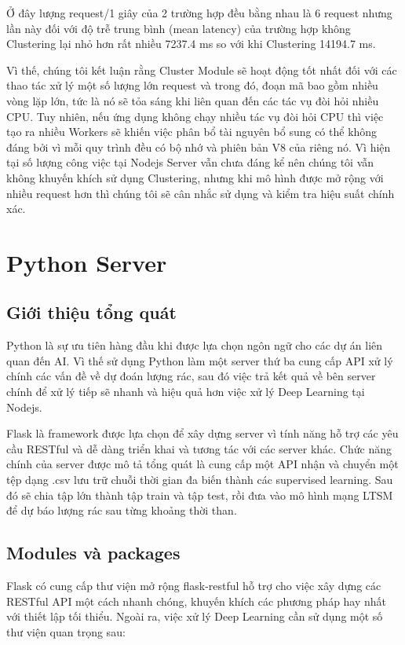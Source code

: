 Ở đây lượng request/1 giây của 2 trường hợp đều bằng nhau là 6 request nhưng lần này đối với độ trễ trung bình (mean latency) của trường hợp không Clustering lại nhỏ hơn rất nhiều 7237.4 ms so với khi Clustering 14194.7 ms.

Vì thế, chúng tôi kết luận rằng Cluster Module sẽ hoạt động tốt nhất đối với các thao tác xử lý một số lượng lớn request và trong đó, đoạn mã bao gồm nhiều vòng lặp lớn, tức là nó sẽ tỏa sáng khi liên quan đến các tác vụ đòi hỏi nhiều CPU. Tuy nhiên, nếu ứng dụng không chạy nhiều tác vụ đòi hỏi CPU thì việc tạo ra nhiều Workers sẽ khiến việc phân bổ tài nguyên bổ sung có thể không đáng bởi vì mỗi quy trình đều có bộ nhớ và phiên bản V8 của riêng nó. Vì hiện tại số lượng công việc tại Nodejs Server vẫn chưa đáng kể nên chúng tôi vẫn không khuyến khích sử dụng Clustering, nhưng khi mô hình được mở rộng với nhiều request hơn thì chúng tôi sẽ cân nhắc sử dụng và kiểm tra hiệu suất chính xác.

\section{Python Server}
\subsection{Giới thiệu tổng quát}
Python là sự ưu tiên hàng đầu khi được lựa chọn ngôn ngữ cho các dự án liên quan đến AI. Vì thế sử dụng Python làm một server thứ ba cung cấp API xử lý chính các vấn đề về dự đoán lượng rác, sau đó việc trả kết quả về bên server chính để xử lý tiếp sẽ nhanh và hiệu quả hơn việc xử lý Deep Learning tại Nodejs.

Flask là framework được lựa chọn để xây dựng server vì tính năng hỗ trợ các yêu cầu RESTful và dễ dàng triển khai và tương tác với các server khác. Chức năng chính của server được mô tả tổng quát là cung cấp một API nhận và chuyển một tệp dạng .csv lưu trữ chuỗi thời gian đa biến thành các supervised learning. Sau đó sẽ chia tập lớn thành tập train và tập test, rồi đưa vào mô hình mạng LTSM để dự báo lượng rác sau từng khoảng thời than. 

\subsection{Modules và packages}
Flask có cung cấp thư viện mở rộng flask-restful hỗ trợ cho việc xây dựng các RESTful API một cách nhanh chóng, khuyến khích các phương pháp hay nhất với thiết lập tối thiểu. Ngoài ra, việc xử lý Deep Learning cần sử dụng một số thư viện quan trọng sau:

